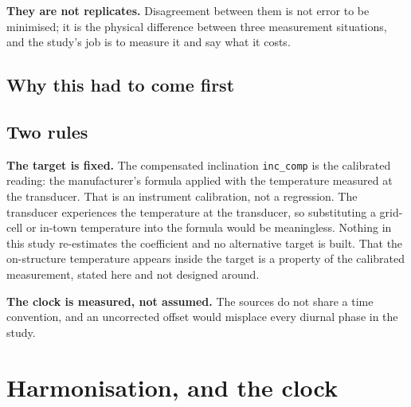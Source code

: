 \documentclass[11pt,a4paper]{article}
\begin{document}
\textbf{They are not replicates.} Disagreement between them is not error to be
minimised; it is the physical difference between three measurement situations,
and the study's job is to measure it and say what it costs.

\subsection{Why this had to come first}


\subsection{Two rules}

\textbf{The target is fixed.} The compensated inclination \texttt{inc\_comp} is
the calibrated reading: the manufacturer's formula applied with the temperature
measured at the transducer. That is an instrument calibration, not a regression.
The transducer experiences the temperature at the transducer, so substituting a
grid-cell or in-town temperature into the formula would be meaningless. Nothing
in this study re-estimates the coefficient and no alternative target is built.
That the on-structure temperature appears inside the target is a property of the
calibrated measurement, stated here and not designed around.

\textbf{The clock is measured, not assumed.} The sources do not share a time
convention, and an uncorrected offset would misplace every diurnal phase in the
study.

\section{Harmonisation, and the clock}
\label{sec:clock}
\end{document}
